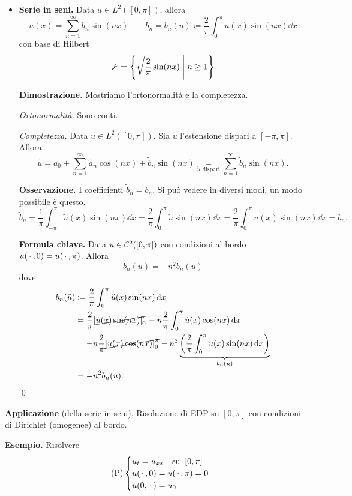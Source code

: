 \begin{itemize}
	\item \textbf{Serie in seni.} Data $u \in L^2([0,\pi])$, allora 
	$$
		u(x) = \sum_{n=1}^\infty b_n \sin(nx) \qquad 
		b_n = b_n(u) \coloneqq  \frac{2}{\pi} \int_0^\pi u(x) \sin(nx) \dd x
	$$
	con base di Hilbert 
	$$
		\mathcal{F} = \left\{ \sqrt{\frac{2}{\pi}} \sin(nx) \;\middle|\; n \geq 1 \right\}
	$$

	\textbf{Dimostrazione.} Mostriamo l'ortonormalità e la completezza.

	\textit{Ortonormalità.} Sono conti.

	\textit{Completezza.} Data $u \in L^2([0,\pi])$. Sia $\tilde{u}$ l'estensione dispari a $[-\pi,\pi]$. Allora 
	$$
		\tilde{u} = a_0 + \sum_{n=1}^{\infty} \tilde{a}_n \cos(nx) + \tilde{b}_n \sin(nx)
		\underset{\tilde{u} \text{ dispari}} = \sum_{n=1}^{\infty} \tilde{b}_n \sin(nx).
	$$

	\textbf{Osservazione.} I coefficienti $\tilde{b}_n = b_n$. Si può vedere in diversi modi, un modo possibile è questo.
	$$
		\tilde{b}_n = \frac{1}{\pi} \int_{-\pi}^{\pi} \tilde{u}(x) \sin(nx) \dd x 
		= \frac{2}{\pi} \int_{0}^{\pi} \tilde{u} \sin(nx) \dd x 
		= \frac{2}{\pi} \int_{0}^{\pi} u(x) \sin(nx) \dd x 
		= b_n.
	$$

	\textbf{Formula chiave.} Data $u \in \mathcal{C}^2 ([0,\pi])$ con condizioni al bordo $u(\,\cdot\,, 0) = u(\,\cdot\,, \pi)$. 
	Allora
	$$
		b_n(\ddot u) = -n^2 b_n(u)
	$$
	dove 
	\begin{align*}
		b_n(\ddot u) & \coloneqq \frac{2}{\pi} \int_0^\pi \ddot u(x) \sin(nx) \,\mathrm{d} x \\
		& = \frac{2}{\pi} \cancel{\left| \dot u(x) \sin(nx) \right|_0^\pi} - n\frac{2}{\pi} \int_{0}^{\pi} \dot u(x) \cos(nx) \,\mathrm{d} x \\
		& = -n \frac{2}{\pi} \cancel{\left| u(x) \cos(nx) \right|_0^\pi} - n^2  \underbrace{\left( \frac{2}{\pi} \int_{0}^{\pi} u(x) \sin(nx) \,\mathrm{d} x \right)}_{b_n(u)} \\
		& = -n^2 b_n(u).
	\end{align*}
	\qed

\end{itemize}


\textbf{Applicazione} (della serie in seni). Risoluzione di EDP su $[0,\pi]$ con condizioni di Dirichlet (omogenee) al bordo.

\textbf{Esempio.} Risolvere
%
\begin{equation}
\label{eq:24nov-problema-1} \tag{P}
	\begin{cases}
		u_t = u_{xx} \quad \text{su} \;\; [0,\pi] \\
		u(\,\cdot\,, 0) = u(\,\cdot\,,\pi) = 0 \\
		u(0,\,\cdot\,) = u_0
	\end{cases} 
\end{equation}

